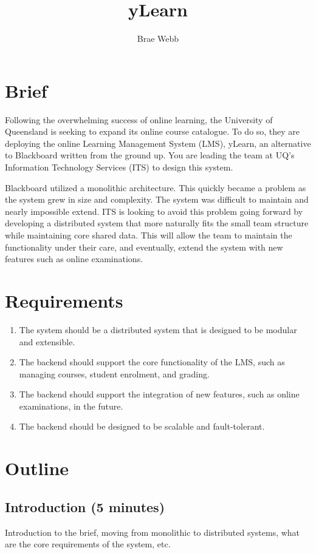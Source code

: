 \documentclass{csse4400}
\title{yLearn}
\author{Brae Webb}
\date{\week[tutorial]{4}}
\begin{document}
\maketitle

\section{Brief}

Following the overwhelming success of online learning,
the University of Queensland is seeking to expand its online course catalogue.
To do so, they are deploying the online Learning Management System (LMS),
yLearn, an alternative to Blackboard written from the ground up.
You are leading the team at UQ's Information Technology Services (ITS) to design this system.

Blackboard utilized a monolithic architecture.
This quickly became a problem as the system grew in size and complexity.
The system was difficult to maintain and nearly impossible extend.
ITS is looking to avoid this problem going forward
by developing a distributed system that more naturally fits the small team structure while maintaining core shared data.
This will allow the team to maintain the functionality under their care, and eventually,
extend the system with new features such as online examinations.

\section{Requirements}

\begin{enumerate}
\item The system should be a distributed system that is designed to be modular and extensible.
\item The backend should support the core functionality of the LMS, such as managing courses, student enrolment, and grading.
\item The backend should support the integration of new features, such as online examinations, in the future.
\item The backend should be designed to be scalable and fault-tolerant.
\end{enumerate}

\section{Outline}

\subsection*{Introduction (5 minutes)}
Introduction to the brief,
moving from monolithic to distributed systems,
what are the core requirements of the system,
etc.
\end{document}
